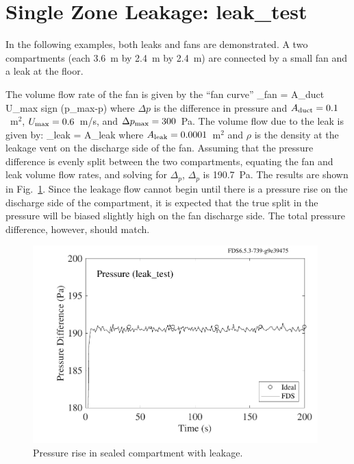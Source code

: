 \documentclass[11pt]{book}
\begin{document}
\clearpage

\section{Single Zone Leakage: {\bf leak\_test}}

In the following examples, both leaks and fans are demonstrated. A two compartments (each 3.6~m by 2.4~m by 2.4~m) are connected by a small fan and a leak at the floor.

The volume flow rate of the fan is given by the ``fan curve'' \be {}_{\hbox{\footnotesize fan}} = A_{\hbox{\footnotesize duct}}
U_{\hbox{\footnotesize max}} \;
   \hbox{sign} (\Delta p_{\hbox{\footnotesize max}}-\Delta p)
     \ee
where $\Delta p$ is the difference in pressure and $A_{\hbox{\scriptsize duct}}=0.1$~m$^2$, $U_{\hbox{\scriptsize max}}=0.6$~m/s, and $\Delta
p_{\hbox{\scriptsize max}}=300$~Pa. The volume flow due to the leak is given by: \be {}_{\hbox{\scriptsize leak}} = A_{\hbox{\scriptsize leak}}
 \ee where $A_{\hbox{\scriptsize leak}}=0.0001$~m$^2$ and $\rho$ is the density at the leakage vent on the discharge side of the fan.  Assuming that the pressure difference is evenly split between the two compartments, equating the fan and leak volume flow rates, and solving for $\Delta_p$, $\Delta_p$ is 190.7~Pa. The results are shown in Fig.~\ref{leak_test}.  Since the leakage flow cannot begin until there is a pressure rise on the discharge side of the compartment, it is expected that the true split in the pressure will be biased slightly high on the fan discharge side.  The total pressure difference, however, should match.

\begin{figure}[ht]
   \begin{center}
      \includegraphics[height=3.00in]{SCRIPT_FIGURES/leak_test.pdf}
     \caption{\label{leak_test} Pressure rise in sealed compartment with leakage.}
   \end{center}
\end{figure}
\end{document}
